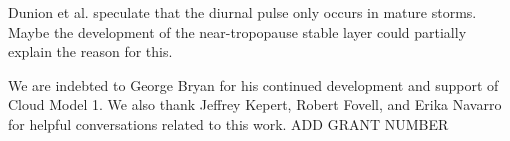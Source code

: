 \documentclass{ametsoc}
\begin{document}
Dunion et al. speculate that the diurnal pulse only occurs in mature storms. Maybe the development of the near-tropopause stable layer could partially explain the reason for this.







%
\acknowledgments
We are indebted to George Bryan for his continued development and support of Cloud Model 1.
We also thank Jeffrey Kepert, Robert Fovell, and Erika Navarro for helpful conversations related to this work.
ADD GRANT NUMBER
\end{document}
